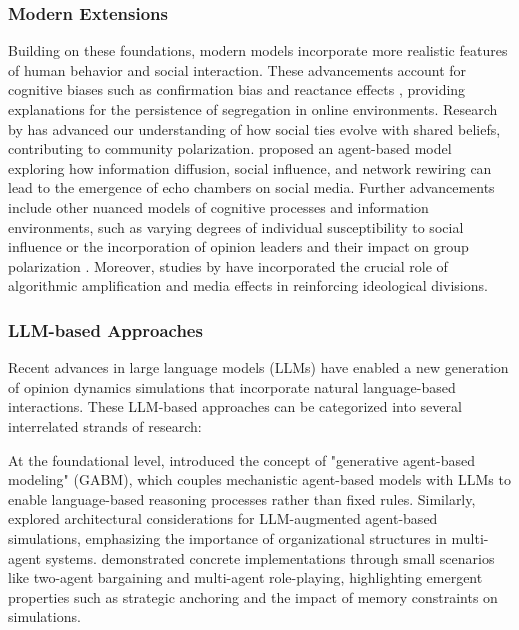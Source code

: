 \subsubsection{Modern Extensions}
Building on these foundations, modern models incorporate more realistic features of human behavior and social interaction. These advancements account for cognitive biases such as confirmation bias \citep{del_vicario_modeling_2017, allahverdyan_opinion_2014} and reactance effects \citep{flache_models_2017, cornacchia_polarization_2020}, providing explanations for the persistence of segregation in online environments. Research by \citep{baumann_modeling_2020} has advanced our understanding of how social ties evolve with shared beliefs, contributing to community polarization. \citep{sasahara_social_2021} proposed an agent-based model exploring how information diffusion, social influence, and network rewiring can lead to the emergence of echo chambers on social media. Further advancements include other nuanced models of cognitive processes and information environments, such as varying degrees of individual susceptibility to social influence \citep{amelkin_polar_2017} or the incorporation of opinion leaders and their impact on group polarization \citep{chen_characteristics_2016}. Moreover, studies by \citep{donkers_-sounding_2023, donkers_dual_2021, geschke_triple-filter_2019} have incorporated the crucial role of algorithmic amplification and media effects in reinforcing ideological divisions.

\subsubsection{LLM-based Approaches}
Recent advances in large language models (LLMs) have enabled a new generation of opinion dynamics simulations that incorporate natural language-based interactions. These LLM-based approaches can be categorized into several interrelated strands of research:

At the foundational level, \citep{ghaffarzadegan_generative_2024} introduced the concept of "generative agent-based modeling" (GABM), which couples mechanistic agent-based models with LLMs to enable language-based reasoning processes rather than fixed rules. Similarly, \citep{gurcan_llm_2024} explored architectural considerations for LLM-augmented agent-based simulations, emphasizing the importance of organizational structures in multi-agent systems. \citep{junprung_exploring_2024} demonstrated concrete implementations through small scenarios like two-agent bargaining and multi-agent role-playing, highlighting emergent properties such as strategic anchoring and the impact of memory constraints on simulations.


